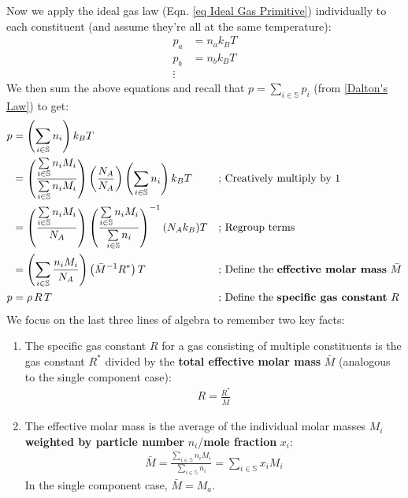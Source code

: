 Now we apply the ideal gas law (Eqn. \ref{eq Ideal Gas Primitive}) individually to each constituent (and assume they're all at the same temperature):
\begin{align*}
    p_a&=n_ak_BT\\
    p_b&=n_bk_BT\\
    \vdots
\end{align*}
We then sum the above equations and recall that \(p=\sum\limits_{i\in\mathbb{S}} p_i\) (from \ref{Dalton's Law}) to get:
\begin{align*}
    p&=\left(\sum\limits_{i\in\mathbb{S}} n_i\right)k_BT
    &&
    \\
    &= \left(\frac{\sum\limits_{i\in\mathbb{S}} n_iM_i}{\sum\limits_{i\in\mathbb{S}} n_iM_i}\right)\left(\frac{N_A}{N_A}\right)\left(\sum\limits_{i\in\mathbb{S}} n_i\right)k_BT
    &\text{; }&\text{Creatively multiply by }1
    \\
    &= \left(\frac{\sum\limits_{i\in\mathbb{S}} n_iM_i}{N_A}\right)\left(\frac{\sum\limits_{i\in\mathbb{S}} n_iM_i}{\sum\limits_{i\in\mathbb{S}} n_i}\right)^{-1}(N_Ak_B)T
    &\text{; }&\text{Regroup terms}
    \\
    &=\left(\sum\limits_{i\in\mathbb{S}}\frac{n_iM_i}{N_A}\right)\left(\bar{M}^{-1}R^*\right)T 
    &\text{; }&\text{Define the \textbf{effective molar mass} }\bar{M}
    \\
    p&=\rho\, R \,T
    &\text{; }&\text{Define the \textbf{specific gas constant} \(R\)}
\end{align*}
We focus on the last three lines of algebra to remember two key facts:
\begin{enumerate}
    \item The specific gas constant \(R\) for a gas consisting of multiple constituents is the gas constant \(R^*\) divided by the \textbf{total effective molar mass} \(\bar{M}\) (analogous to the single component case):
    \begin{align}
        R=\frac{R^*}{\bar{M}}
    \end{align}
    \item The effective molar mass is the average of the individual molar masses \(M_i\) \textbf{weighted by particle number} \(n_i\)/\textbf{mole fraction} \(x_i\):
    \begin{align}
        \boxed{\bar{M} =\frac{\sum\limits_{i\in\mathbb{S}} n_iM_i}{\sum\limits_{i\in\mathbb{S}} n_i}=\sum\limits_{i\in\mathbb{S}} x_iM_i}
    \end{align}
    In the single component case, \(\bar{M}=M_a\).
\end{enumerate}

